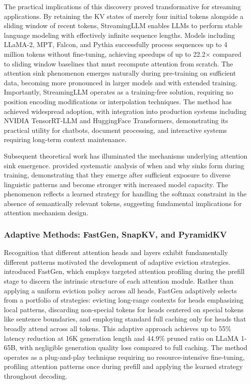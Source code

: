 The practical implications of this discovery proved transformative for streaming applications. By retaining the KV states of merely four initial tokens alongside a sliding window of recent tokens, StreamingLLM enables LLMs to perform stable language modeling with effectively infinite sequence lengths. Models including LLaMA-2, MPT, Falcon, and Pythia successfully process sequences up to 4 million tokens without fine-tuning, achieving speedups of up to 22.2$\times$ compared to sliding window baselines that must recompute attention from scratch. The attention sink phenomenon emerges naturally during pre-training on sufficient data, becoming more pronounced in larger models and with extended training. Importantly, StreamingLLM operates as a training-free solution, requiring no position encoding modifications or interpolation techniques. The method has achieved widespread adoption, with integration into production systems including NVIDIA TensorRT-LLM and HuggingFace Transformers, demonstrating its practical utility for chatbots, document processing, and interactive systems requiring long-term context maintenance.

Subsequent theoretical work has illuminated the mechanisms underlying attention sink emergence. \citet{wu2025whenattentionsinkemerges} provided systematic analysis of when and why sinks form during training, demonstrating that they emerge after sufficient exposure to diverse linguistic patterns and become stronger with increased model capacity. The phenomenon reflects a learned strategy for handling the softmax constraint in the absence of semantically relevant tokens, suggesting fundamental implications for attention mechanism design.

\subsubsection{Adaptive Methods: FastGen, SnapKV, and PyramidKV}

Recognition that different attention heads and layers exhibit fundamentally different patterns motivated the development of adaptive eviction strategies. \citet{ge2024model} introduced FastGen, which employs targeted attention profiling during the prefill stage to discern the intrinsic structure of each attention module. Rather than applying a uniform eviction policy across all heads, FastGen adaptively selects from a portfolio of strategies: evicting long-range contexts for heads emphasizing local patterns, discarding non-special tokens for heads centered on special tokens like sentence boundaries, and employing standard full caching only for heads that broadly attend across all tokens. This adaptive approach achieves up to 55\% latency reduction at 16K generation length and 44.9\% pruned ratio on LLaMA 1-65B, with negligible generation quality loss compared to full caching. The method operates as a plug-and-play technique requiring no resource-intensive fine-tuning, profiling attention patterns once during prefill and applying the learned strategy throughout decoding.

